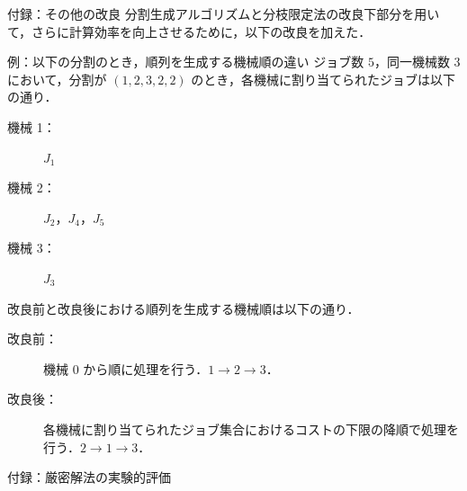 \documentclass[dvipdfmx]{beamer}
\begin{document}
    \begin{frame}{付録：その他の改良}
      分割生成アルゴリズムと分枝限定法の改良下部分を用いて，さらに計算効率を向上させるために，以下の改良を加えた．
      \begin{exampleblock}{例：以下の分割のとき，順列を生成する機械順の違い}
        ジョブ数 $5$，同一機械数 $3$ において，分割が $(1,2,3,2,2)$ のとき，各機械に割り当てられたジョブは以下の通り．
        \begin{description}
          \item[機械 1：] $J_1$
          \item[機械 2：] $J_2$，$J_4$，$J_5$
          \item[機械 3：] $J_3$
        \end{description}
        改良前と改良後における順列を生成する機械順は以下の通り．
        \begin{description}
          \item[改良前：] 機械 $0$ から順に処理を行う．$1 \to 2 \to 3$．
          \item[改良後：] 各機械に割り当てられたジョブ集合におけるコストの下限の降順で処理を行う．$2 \to 1 \to 3$．
        \end{description}
      \end{exampleblock}
    \end{frame}

    \begin{frame}{付録：厳密解法の実験的評価}

    \end{frame}
    
\end{document}
